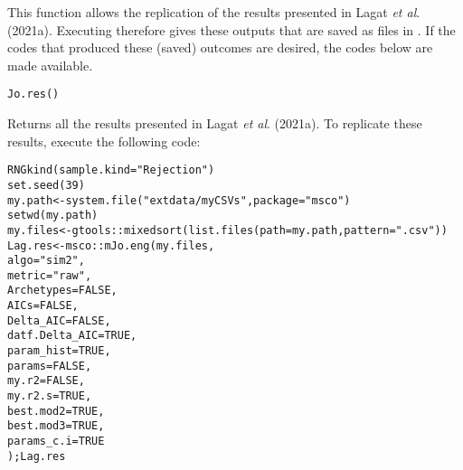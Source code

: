 \documentclass[a4paper]{book}
\begin{document}
%
\begin{Description}\relax
This function allows the replication of the results presented in Lagat \emph{et al}. (2021a). Executing
 therefore gives these outputs that are saved as  files in . If the codes that
produced these (saved) outcomes are desired, the codes below are made available.
\end{Description}
%
\begin{Usage}
\begin{verbatim}
Jo.res()
\end{verbatim}
\end{Usage}
%
\begin{Value}
Returns all the results presented in Lagat \emph{et al}. (2021a). To replicate these results,
execute the following code:\begin{alltt}  RNGkind(sample.kind = "Rejection")
  set.seed(39)
  my.path <- system.file("extdata/myCSVs", package = "msco")
  setwd(my.path)
  my.files <- gtools::mixedsort(list.files(path = my.path, pattern = ".csv"))
  Lag.res <- msco::mJo.eng(my.files,
                   algo = "sim2",
                   metric = "raw",
                   Archetypes = FALSE,
                   AICs = FALSE,
                   Delta_AIC = FALSE,
                   datf.Delta_AIC = TRUE,
                   param_hist = TRUE,
                   params = FALSE,
                   my.r2 = FALSE,
                   my.r2.s = TRUE,
                   best.mod2 = TRUE,
                   best.mod3 = TRUE,
                   params_c.i = TRUE
                  );Lag.res


\end{alltt}
\end{Value}
\end{document}
